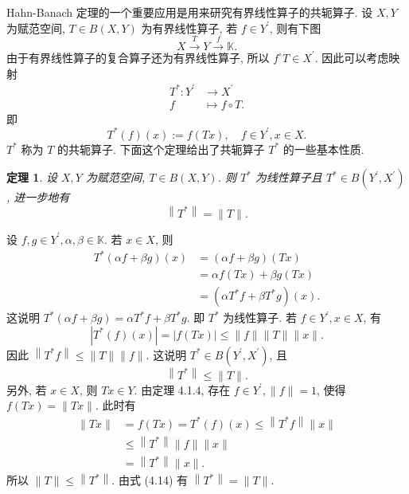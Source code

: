 \documentclass[openany]{ctexbook}
\makeatletter
\theoremstyle{kaiti}
\newtheorem{theorem}{定理}[section]
\theoremstyle{normal}
\renewenvironment{proof}[1][\proofname]{\par
    \pushQED{\qed}%
    \normalfont \topsep6\p@\@plus6\p@\relax
    \trivlist
    \item\relax
    {\heiti #1}\hspace{2\labelsep}\ignorespaces
  }{%
    \popQED\endtrivlist\@endpefalse
  }
\makeatother
\begin{document}
Hahn-Banach 定理的一个重要应用是用来研究有界线性算子的共轭算子. 设 $X, Y$ 为赋范空间, $T \in B(X, Y)$ 为有界线性算子, 若 $f \in Y^{\prime}$, 则有下图
$$
X \stackrel{T}{\longrightarrow} Y \stackrel{f}{\longrightarrow} \mathbb{K}.
$$
由于有界线性算子的复合算子还为有界线性算子, 所以 $f^{\circ} T \in X^{\prime}$. 因此可以考虑映射
$$
\begin{aligned}
T^{*}: Y^{\prime} & \rightarrow X^{\prime} \\
f & \mapsto f \circ T.
\end{aligned}
$$
即
\begin{equation}
  T^{*}(f)(x):=f(T x), \quad f \in Y^{\prime}, x \in X.
\end{equation}
$T^{*}$ 称为 $T$ 的共轭算子. 下面这个定理给出了共轭算子 $T^{*}$ 的一些基本性质.

\begin{theorem}
设 $X, Y$ 为赋范空间, $T \in B(X, Y)$. 则 $T^{*}$ 为线性算子且 $T^{*} \in B\left(Y^{\prime}, X^{\prime}\right)$, 进一步地有
$$
\left\|T^{*}\right\|=\|T\|.
$$
\end{theorem}

\begin{proof}
设 $f, g \in Y^{\prime}, \alpha, \beta \in \mathbb{K}$. 若 $x \in X$, 则
$$
\begin{aligned}
T^{*}(\alpha f+\beta g)(x) &=(\alpha f+\beta g)(T x) \\
&=\alpha f(T x)+\beta g(T x) \\
&=\left(\alpha T^{*} f+\beta T^{*} g\right)(x).
\end{aligned}
$$
这说明 $T^{*}(\alpha f+\beta g)=\alpha T^{*} f+\beta T^{*} g$. 即 $T^{*}$ 为线性算子. 若 $f \in Y^{\prime}, x \in X$, 有
$$
\left|T^{*}(f)(x)\right|=|f(T x)| \leqslant\|f\|\|T\|\|x\|.
$$
因此 $\left\|T^{*} f\right\| \leqslant\|T\|\|f\|$. 这说明 $T^{*} \in B\left(Y^{\prime}, X^{\prime}\right)$, 且
\begin{equation}
  \left\|T^{*}\right\| \leqslant\|T\|.
\end{equation}
另外, 若 $x \in X$, 则 $T x \in Y$. 由定理 4.1.4, 存在 $f \in Y^{\prime},\|f\|=1$, 使得 $f(T x)=\|T x\|$. 此时有
$$
\begin{aligned}
\|T x\| &=f(T x)=T^{*}(f)(x) \leqslant\left\|T^{*} f\right\|\|x\| \\
& \leqslant\left\|T^{*}\right\|\|f\|\|x\| \\
&=\left\|T^{*}\right\|\|x\|.
\end{aligned}
$$
所以 $\|T\| \leqslant\left\|T^{*}\right\|$. 由式 (4.14) 有 $\left\|T^{*}\right\|=\|T\|$.
\end{proof}
\end{document}
